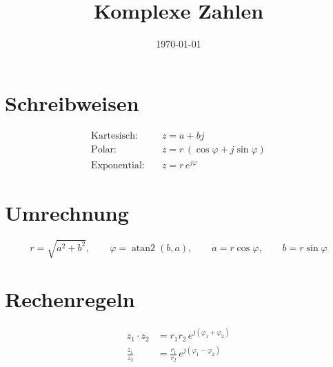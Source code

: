 \documentclass[11pt,a4paper]{article}
\title{Komplexe Zahlen}
\author{}
\date{\today}
\begin{document}
\maketitle

\section{Schreibweisen}
\begin{align*}
  \text{Kartesisch:}   \quad & z = a + bj \\
  \text{Polar:}        \quad & z = r\,(\cos\varphi + j\sin\varphi) \\
  \text{Exponential:}  \quad & z = r\,e^{j\varphi}
\end{align*}

\section{Umrechnung}
\[
  r = \sqrt{a^2 + b^2}, \qquad \varphi = \operatorname{atan2}(b, a), \qquad
  a = r\cos\varphi, \qquad b = r\sin\varphi
\]

\section{Rechenregeln}
\begin{align*}
  z_1 \cdot z_2 &= r_1 r_2 \, e^{j(\varphi_1 + \varphi_2)} \\
  \frac{z_1}{z_2} &= \frac{r_1}{r_2} \, e^{j(\varphi_1 - \varphi_2)}
\end{align*}
\end{document}

